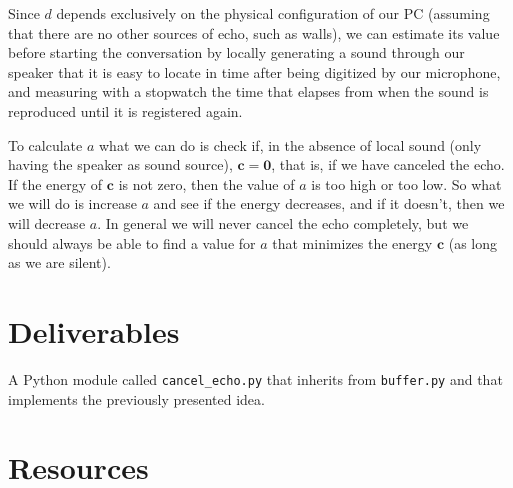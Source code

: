 Since $d$ depends exclusively on the physical configuration of our PC
(assuming that there are no other sources of echo, such as walls), we
can estimate its value before starting the conversation by locally
generating a sound through our speaker that it is easy to locate in
time after being digitized by our microphone, and measuring with a
stopwatch the time that elapses from when the sound is reproduced
until it is registered again.

To calculate $a$ what we can do is check if, in the absence of local
sound (only having the speaker as sound source),
${\mathbf c}={\mathbf 0}$, that is, if we have canceled the echo. If
the energy of ${\mathbf c}$ is not zero, then the value of $a$ is too
high or too low. So what we will do is increase $a$ and see if the
energy decreases, and if it doesn't, then we will decrease $a$. In
general we will never cancel the echo completely, but we should always
be able to find a value for $a$ that minimizes the energy
${\mathbf c}$ (as long as we are silent).

\section{Deliverables}

A Python module called \texttt{cancel\_echo.py} that inherits from
\texttt{buffer.py} and that implements the previously presented idea.

\section{Resources}


